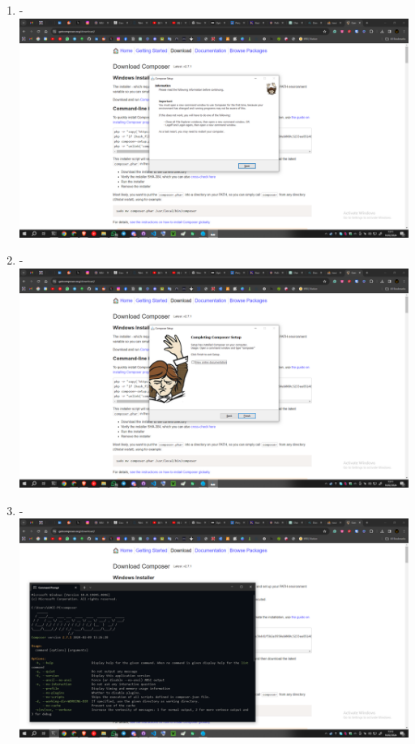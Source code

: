 \documentclass[12pt,titlepage]{article}
\begin{document}
\begin{enumerate}[label= \alph*.]
    \newpage
    \item - \\ \includegraphics[width=.9\textwidth]{images/figures/Composer 5.png}
    \item - \\ \includegraphics[width=.9\textwidth]{images/figures/Composer 6.png}
    \newpage
    \item - \\ \includegraphics[width=.9\textwidth]{images/figures/Composer 7.png}
\end{enumerate}

\newpage
\end{document}
